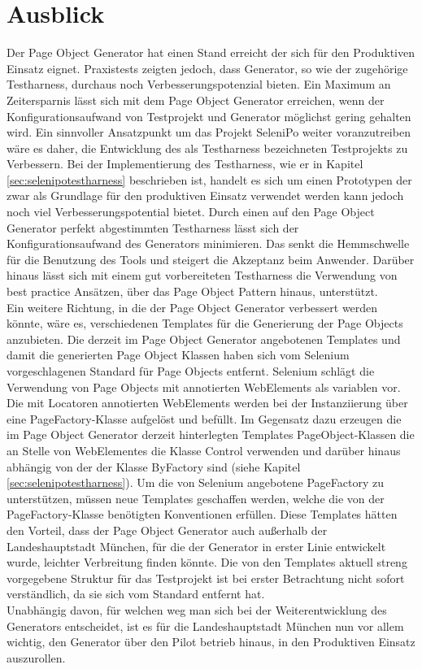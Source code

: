 \section{Ausblick}
\label{ausblick}
Der Page Object Generator hat einen Stand erreicht der sich für den Produktiven Einsatz eignet. Praxistests zeigten jedoch, dass Generator, so wie der zugehörige Testharness, durchaus noch Verbesserungspotenzial bieten.
Ein Maximum an Zeitersparnis lässt sich mit dem Page Object Generator erreichen, wenn der Konfigurationsaufwand von Testprojekt und Generator möglichst gering gehalten wird.
Ein sinnvoller Ansatzpunkt um das Projekt SeleniPo weiter voranzutreiben wäre es daher, die Entwicklung des als Testharness bezeichneten Testprojekts zu Verbessern. Bei der Implementierung des Testharness, wie er in Kapitel \ref{sec:selenipotestharness} beschrieben ist, handelt es sich um einen Prototypen der zwar als Grundlage für den produktiven Einsatz verwendet werden kann jedoch noch viel Verbesserungspotential bietet. Durch einen auf den Page Object Generator perfekt abgestimmten Testharness lässt sich der Konfigurationsaufwand des Generators minimieren. Das senkt die Hemmschwelle für die Benutzung des Tools und steigert die Akzeptanz beim Anwender.
Darüber hinaus lässt sich mit einem gut vorbereiteten Testharness die Verwendung von best practice Ansätzen, über das Page Object Pattern hinaus, unterstützt.\\
Ein weitere Richtung, in die der Page Object Generator verbessert werden könnte, wäre es, verschiedenen Templates für die Generierung der Page Objects anzubieten.
Die derzeit im Page Object Generator angebotenen Templates und damit die generierten Page Object Klassen haben sich vom Selenium vorgeschlagenen Standard für Page Objects entfernt. Selenium schlägt die Verwendung von Page Objects mit annotierten WebElements als variablen vor. Die mit Locatoren annotierten WebElements werden bei der Instanziierung über eine PageFactory-Klasse aufgelöst und befüllt.
Im Gegensatz dazu erzeugen die im Page Object Generator derzeit hinterlegten Templates PageObject-Klassen die an Stelle von WebElementes die Klasse Control verwenden und darüber hinaus abhängig von der der Klasse ByFactory sind (siehe Kapitel \ref{sec:selenipotestharness}). Um die von Selenium angebotene PageFactory zu unterstützen, müssen neue Templates geschaffen werden, welche die von der PageFactory-Klasse benötigten Konventionen erfüllen.
Diese Templates hätten den Vorteil, dass der Page Object Generator auch außerhalb der Landeshauptstadt München, für die der Generator in erster Linie entwickelt wurde, leichter Verbreitung finden könnte. Die von den Templates aktuell streng vorgegebene Struktur für das Testprojekt ist bei erster Betrachtung nicht sofort verständlich, da sie sich vom Standard entfernt hat.\\
Unabhängig davon, für welchen weg man sich bei der Weiterentwicklung des Generators entscheidet, ist es für die Landeshauptstadt München nun vor allem wichtig, den Generator über den Pilot betrieb hinaus, in den Produktiven Einsatz auszurollen.












